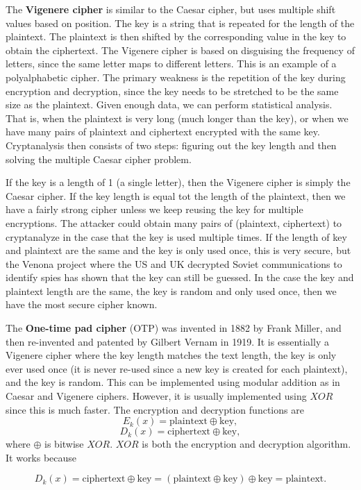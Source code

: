 \documentclass[11pt]{article}
\theoremstyle{plain} %
\theoremstyle{definition}
\theoremstyle{example}
\theoremstyle{remark}
\begin{document}
The \textbf{Vigenere cipher} is similar to the Caesar cipher, but uses multiple shift values based on position. The key is a string that is repeated for the length of the plaintext. The plaintext is then shifted by the corresponding value in the key to obtain the ciphertext. The Vigenere cipher is based on disguising the frequency of letters, since the same letter maps to different letters. This is an example of a polyalphabetic cipher. The primary weakness is the repetition of the key during encryption and decryption, since the key needs to be stretched to be the same size as the plaintext. Given enough data, we can perform statistical analysis. That is, when the plaintext is very long (much longer than the key), or when we have many pairs of plaintext and ciphertext encrypted with the same key. Cryptanalysis then consists of two steps: figuring out the key length and then solving the multiple Caesar cipher problem. 

If the key is a length of 1 (a single letter), then the Vigenere cipher is simply the Caesar cipher. If the key length is equal tot the length of the plaintext, then we have a fairly strong cipher unless we keep reusing the key for multiple encryptions. The attacker could obtain many pairs of (plaintext, ciphertext) to cryptanalyze in the case that the key is used multiple times. If the length of key and plaintext are the same and the key is only used once, this is very secure, but the Venona project where the US and UK decrypted Soviet communications to identify spies has shown that the key can still be guessed. In the case the key and plaintext length are the same, the key is random and only used once, then we have the most secure cipher known. 

The \textbf{One-time pad cipher} (OTP) was invented in 1882 by Frank Miller, and then re-invented and patented by Gilbert Vernam in 1919. It is essentially a Vigenere cipher where the key length matches the text length, the key is only ever used once (it is never re-used since a new key is created for each plaintext), and the key is random. This can be implemented using modular addition as in Caesar and Vigenere ciphers. However, it is usually implemented using $XOR$ since this is much faster. The encryption and decryption functions are
$$E_k(x) = \text{plaintext}\oplus\text{key},$$
$$D_k(x) = \text{ciphertext}\oplus\text{key},$$
where $\oplus$ is bitwise $XOR$. $XOR$ is both the encryption and decryption algorithm. It works because 

$$D_k(x) = \text{ciphertext}\oplus\text{key} = \left(\text{plaintext}\oplus\text{key}\right)\oplus\text{key} = \text{plaintext}.$$
 
\end{document}
